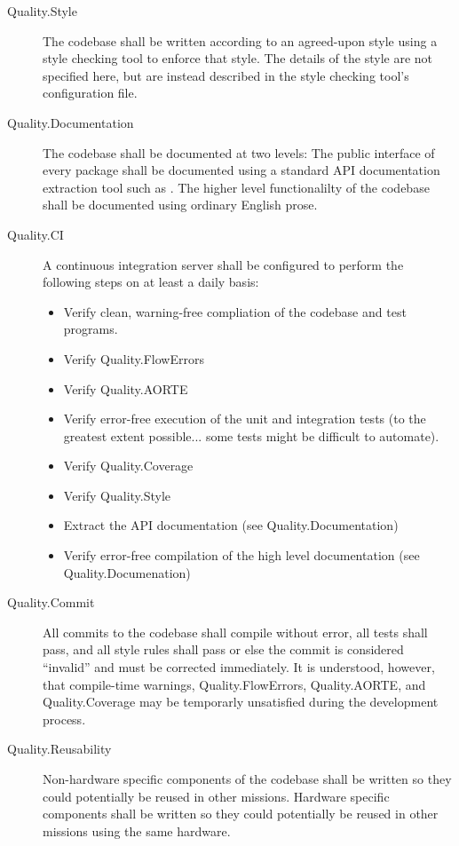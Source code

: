 \begin{description}
\item[Quality.Style] The codebase shall be written according to an agreed-upon style using a
  style checking tool to enforce that style. The details of the style are not specified here,
  but are instead described in the style checking tool's configuration file.

\item[Quality.Documentation] The codebase shall be documented at two levels: The public
  interface of every package shall be documented using a standard API documentation extraction
  tool such as . The higher level functionalilty of the codebase shall be
  documented using ordinary English prose.
  
\item[Quality.CI] A continuous integration server shall be configured to perform the following
  steps on at least a daily basis:
  \begin{itemize}
  \item Verify clean, warning-free compliation of the codebase and test programs.
  \item Verify Quality.FlowErrors
  \item Verify Quality.AORTE
  \item Verify error-free execution of the unit and integration tests (to the greatest extent
    possible... some tests might be difficult to automate).
  \item Verify Quality.Coverage
  \item Verify Quality.Style
  \item Extract the API documentation (see Quality.Documentation)
  \item Verify error-free compilation of the high level documentation (see Quality.Documenation)
  \end{itemize}

\item[Quality.Commit] All commits to the codebase shall compile without error, all tests shall
  pass, and all style rules shall pass or else the commit is considered ``invalid'' and must be
  corrected immediately. It is understood, however, that compile-time warnings,
  Quality.FlowErrors, Quality.AORTE, and Quality.Coverage may be temporarly unsatisfied during
  the development process.

\item[Quality.Reusability] Non-hardware specific components of the codebase shall be written so
  they could potentially be reused in other missions. Hardware specific components shall be
  written so they could potentially be reused in other missions using the same hardware.

\end{description}

